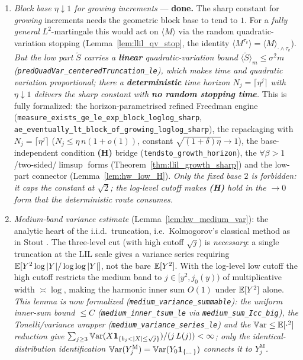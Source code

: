 \begin{enumerate}
  \item \emph{Block base $\eta\downarrow1$ for growing increments} --- \textbf{done.} The sharp
        constant for \emph{growing} increments needs the geometric block base to tend to $1$. For a
        \emph{fully general} $L^2$-martingale this would act on $\langle M\rangle$ via the random
        quadratic-variation stopping (Lemma~\ref{lem:llil_qv_stop}, the identity
        $\langle M^{\tau_v}\rangle=\langle M\rangle_{\cdot\wedge\tau_v}$). \emph{But the low part
        $\tilde S$ carries a \textbf{linear} quadratic-variation bound
        $\langle\tilde S\rangle_m\le\sigma^2 m$
        (\texttt{predQuadVar\_centeredTruncation\_le}), which makes time and quadratic variation
        proportional; there a \textbf{deterministic} time horizon $N_j=\lceil\eta^j\rceil$ with
        $\eta\downarrow1$ delivers the sharp constant with \textbf{no random stopping time}.} This is
        fully formalized: the horizon-parametrised refined Freedman engine
        (\texttt{measure\_exists\_ge\_le\_exp\_block\_loglog\_sharp},
        \texttt{ae\_eventually\_lt\_block\_of\_growing\_loglog\_sharp}), the repackaging with
        $N_j=\lceil\eta^j\rceil$ ($N_j\le\eta\,n(1+o(1))$, constant $\sqrt{(1+\delta)\eta}\to1$), the
        base-independent condition \textbf{(H)} bridge (\texttt{tendsto\_growth\_horizon}), the
        $\forall\beta>1$/two-sided/$\limsup$ forms (Theorem~\ref{thm:llil_growth_sharp}) and the
        low-part connector (Lemma~\ref{lem:hw_low_H}). \emph{Only the fixed base $2$ is forbidden: it
        caps the constant at $\sqrt2$; the log-level cutoff makes \textbf{(H)} hold in the $\to0$ form
        that the deterministic route consumes.}
  \item \emph{Medium-band variance estimate} (Lemma~\ref{lem:hw_medium_var}): the analytic heart of
        the i.i.d.\ truncation, i.e.\ Kolmogorov's classical method as in Stout \cite[Ch.~5]{Stout1974}.
        The three-level cut (with high cutoff $\sqrt j$) is \emph{necessary}: a single truncation at
        the LIL scale gives a variance series requiring $\mathbb{E}[Y^2\log|Y|/\log\log|Y|]$, not the bare
        $\mathbb{E}[Y^2]$. With the log-level low cutoff the high cutoff restricts the medium band to
        $j\in[y^2,j_0(y))$ of multiplicative width $\asymp\log$, making the harmonic inner sum $O(1)$
        under $\mathbb{E}[Y^2]$ alone. \emph{This lemma is now formalized
        (\texttt{medium\_variance\_summable}): the uniform inner-sum bound $\le C$
        (\texttt{medium\_inner\_tsum\_le} via \texttt{medium\_sum\_Icc\_big}), the Tonelli/variance
        wrapper (\texttt{medium\_variance\_series\_le}) and the $\mathbb{V}\mathrm{ar}\le\mathbb{E}[\cdot^2]$ reduction give
        $\sum_{j\ge3}\Var(X\indic_{\{b_j<|X|\le\sqrt j\}})/(j\,L(j))<\infty$; only the identical-%
        distribution identification $\mathbb{V}\mathrm{ar}(Y_j^{\mathrm M})=\mathbb{V}\mathrm{ar}(Y_0\mathbf{1}_{\{\dots\}})$ connects it to
        $Y_j^{\mathrm M}$.}
\end{enumerate}
